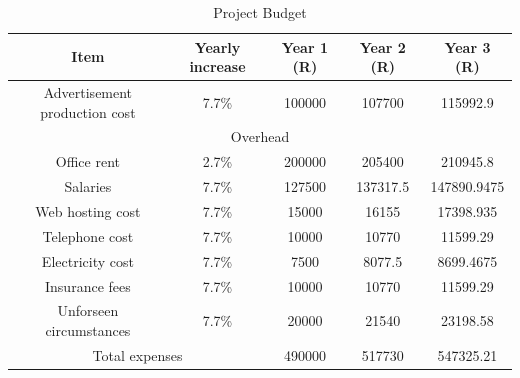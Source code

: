 \documentclass{article}
\begin{document}
\begin{table}[H]
 \caption{Project Budget}
    \centering
    \begin{tabular}{|c|c|c|c|c|}
    \hline
      Item&Yearly increase&Year 1 (R) &Year 2 (R) &Year 3 (R)\\
      \hline
      Advertisement production cost&7.7\%&100000&107700&115992.9\\



    \hline
    \multicolumn{5}{|c|}{Overhead}\\
    \hline
      Office rent&2.7\%&200000&205400&210945.8\\
      Salaries&7.7\%&127500&137317.5&147890.9475\\
      Web hosting cost&7.7\%&15000&16155&17398.935\\
      Telephone cost&7.7\%&10000&10770&11599.29\\
      Electricity cost&7.7\%&7500&8077.5&8699.4675\\
      Insurance fees&7.7\%&10000&10770&11599.29\\
      Unforseen circumstances&7.7\%&20000&21540&23198.58\\
    \hline
      \multicolumn{2}{|c|}{Total expenses} &490000&517730&547325.21\\
\hline

    \end{tabular}
   
    \label{tab:project budget}
\end{table}
\end{document}
